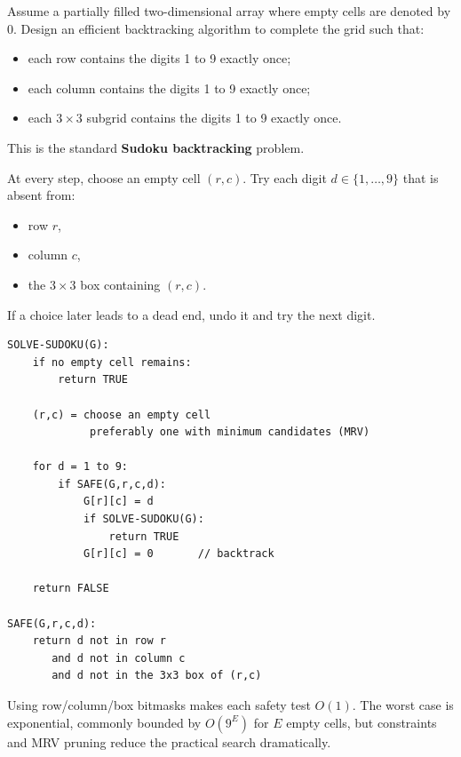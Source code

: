 \documentclass[11pt,a4paper]{article}
\begin{document}
\begin{qaquestion}
Assume a partially filled two-dimensional array where empty cells are denoted by 0. Design an efficient backtracking algorithm to complete the grid such that:
\begin{itemize}[leftmargin=1.5em]
\item each row contains the digits 1 to 9 exactly once;
\item each column contains the digits 1 to 9 exactly once;
\item each \(3\times3\) subgrid contains the digits 1 to 9 exactly once.
\end{itemize}
\end{qaquestion}

\begin{qaanswer}[Answer 4(a)]
This is the standard \textbf{Sudoku backtracking} problem.

At every step, choose an empty cell \((r,c)\). Try each digit \(d\in\{1,\ldots,9\}\) that is absent from:
\begin{itemize}[leftmargin=1.5em]
\item row \(r\),
\item column \(c\),
\item the \(3\times3\) box containing \((r,c)\).
\end{itemize}
If a choice later leads to a dead end, undo it and try the next digit.

\begin{lstlisting}
SOLVE-SUDOKU(G):
    if no empty cell remains:
        return TRUE

    (r,c) = choose an empty cell
             preferably one with minimum candidates (MRV)

    for d = 1 to 9:
        if SAFE(G,r,c,d):
            G[r][c] = d
            if SOLVE-SUDOKU(G):
                return TRUE
            G[r][c] = 0       // backtrack

    return FALSE

SAFE(G,r,c,d):
    return d not in row r
       and d not in column c
       and d not in the 3x3 box of (r,c)
\end{lstlisting}

Using row/column/box bitmasks makes each safety test \(O(1)\). The worst case is exponential, commonly bounded by \(O(9^E)\) for \(E\) empty cells, but constraints and MRV pruning reduce the practical search dramatically.
\end{qaanswer}
\end{document}
